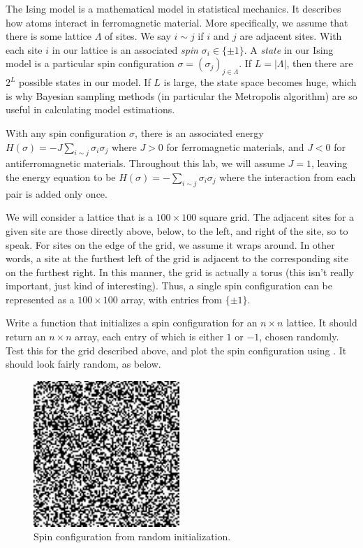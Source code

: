 
The Ising model is a mathematical model in statistical mechanics. It describes how atoms interact in ferromagnetic material. More specifically, we assume that there is some lattice $\Lambda$ of sites. We say $i \sim j$ if $i$ and $j$ are adjacent sites. With each site $i$ in our lattice is an associated \emph{spin} $\sigma_{i} \in \{\pm 1\}$. A \emph{state} in our Ising model is a particular spin configuration $\sigma = (\sigma_{j})_{j \in \Lambda}$. If $L = |\Lambda|$, then there are $2^{L}$ possible states in our model. If $L$ is large, the state space becomes huge, which is why Bayesian sampling methods (in particular the Metropolis algorithm) are so useful in calculating model estimations.

With any spin configuration $\sigma$, there is an associated energy $H(\sigma) = -J \sum_{i \sim j} \sigma_{i} \sigma_{j}$ where $J > 0$ for ferromagnetic materials, and $J < 0$ for antiferromagnetic materials. Throughout this lab, we will assume $J = 1$, leaving the energy equation to be $H(\sigma) = -\sum_{i \sim j} \sigma_{i}\sigma_{j}$ where the interaction from each pair is added only once.

We will consider a lattice that is a $100 \times 100$ square grid. The adjacent sites for a given site are those directly above, below, to the left, and right of the site, so to speak. For sites on the edge of the grid, we assume it wraps around. In other words, a site at the furthest left of the grid is adjacent to the corresponding site on the furthest right. In this manner, the grid is actually a torus (this isn't really important, just kind of interesting). Thus, a single spin configuration can be represented as a $100 \times 100$ array, with entries from $\{\pm 1\}$.

\begin{problem}
Write a function that initializes a spin configuration for an $n \times n$ lattice. It should return an $n \times n$ array, each entry of which is either $1$ or $-1$, chosen randomly. Test this for the grid described above, and plot the spin configuration using . It should look fairly random, as below.
\end{problem}

\begin{figure}
\centering
\includegraphics[width=.5\textwidth]{init.pdf}
\caption{Spin configuration from random initialization.}
\end{figure}

